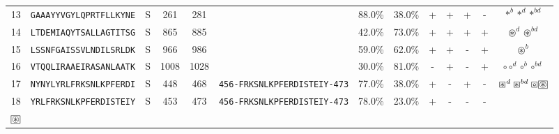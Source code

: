 \begin{tabular}{rcccccccccccc}
13 &  \texttt{GAAAYYVGYLQPRTFLLKYNE} &       S &    261 &   281 &                                                                  &                          88.0\% &                           38.0\% &          + &           + &          + &           - &                                                                                                        $ \ast^b \ast^d \ast^{bd} $ \\
14 &  \texttt{LTDEMIAQYTSALLAGTITSG} &       S &    865 &   885 &                                                                  &                          42.0\% &                           73.0\% &          + &           + &          + &           + &                                                                                                 $ \circledast^d \circledast^{bd} $ \\
15 &  \texttt{LSSNFGAISSVLNDILSRLDK} &       S &    966 &   986 &                                                                  &                          59.0\% &                           62.0\% &          + &           + &          - &           + &                                                                                                                  $ \circledast^b $ \\
16 &  \texttt{VTQQLIRAAEIRASANLAATK} &       S &   1008 &  1028 &                                                                  &                          30.0\% &                           81.0\% &          - &           + &          - &           + &                                                                                               $ \circ \circ^d \circ^b \circ^{bd} $ \\
17 &  \texttt{NYNYLYRLFRKSNLKPFERDI} &       S &    448 &   468 &  \texttt{{\scriptsize 456-}FRKSNLKPFERDISTEIY{\scriptsize -473}} &                          77.0\% &                           38.0\% &          + &           - &          + &           - &                                              $ \boxast^d \boxast^{bd} \boxcircle \setlength{\fboxsep}{0.5pt} \boxed{\circledast} $ \\
18 &  \texttt{YRLFRKSNLKPFERDISTEIY} &       S &    453 &   473 &  \texttt{{\scriptsize 456-}FRKSNLKPFERDISTEIY{\scriptsize -473}} &                          78.0\% &                           23.0\% &          + &           - &          - &           - &                    \Centerstack{  $\boxempty \boxast \boxast^b \boxcircle$ \\  $\setlength{\fboxsep}{0.5pt} \boxed{\circledast}$ } \\

\end{tabular}
